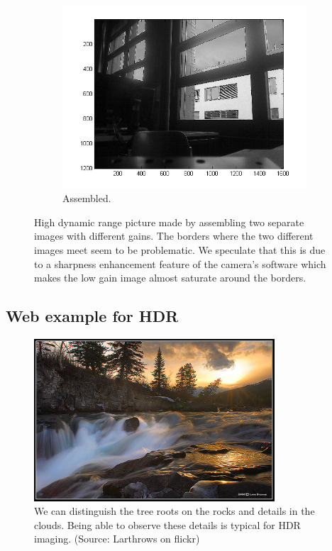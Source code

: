 \documentclass[a4paper, 12pt]{paper}
\begin{document}
\begin{figure}[H]
\begin{subfigure}[b]{0.32\textwidth}
        \includegraphics[width=\textwidth]{img/HDR_assembled}
        \caption{Assembled.}
    \end{subfigure}
    \caption{High dynamic range picture made by assembling two separate images with different gains.
        The borders where the two different images meet seem to be problematic.
        We speculate that this is due to a sharpness enhancement feature of the camera's software which makes the low gain image almost saturate around the borders.}
\label{fig:hdr}
\end{figure}

\subsection{Web example for HDR}

\begin{figure}[H]
    \centering
    \includegraphics[width=0.8\textwidth]{img/web_example}
    \caption{We can distinguish the tree roots on the rocks and details in the clouds.
            Being able to observe these details is typical for HDR imaging.
            (Source: Larthrows on flickr)}
\label{fig:web_example}
\end{figure}
\end{document}
